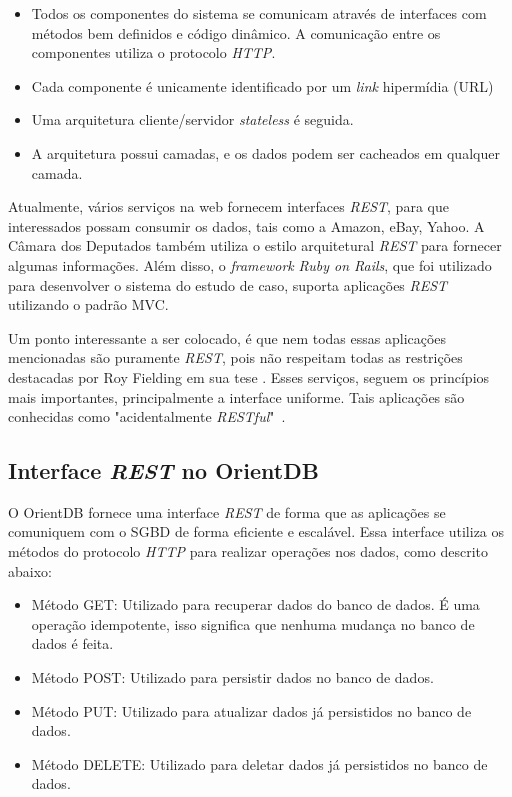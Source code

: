 \begin{itemize}
	\item Todos os componentes do sistema se comunicam através de interfaces com métodos bem definidos e código dinâmico. A comunicação entre os componentes utiliza o protocolo \textit{HTTP}.
	\item Cada componente é unicamente identificado por um \textit{link} hipermídia (URL)
	\item Uma arquitetura cliente/servidor \textit{stateless} é seguida.
	\item A arquitetura possui camadas, e os dados podem ser cacheados em qualquer camada.
\end{itemize}

	Atualmente, vários serviços na web fornecem interfaces \textit{REST}, para que interessados possam consumir os dados, tais como a Amazon, eBay, Yahoo. A Câmara dos Deputados também utiliza o estilo arquitetural \textit{REST} para fornecer algumas informações. Além disso, o \textit{framework} \textit{Ruby on Rails}, que foi utilizado para desenvolver o sistema do estudo de caso, suporta aplicações \textit{REST} utilizando o padrão MVC.
	
	Um ponto interessante a ser colocado, é que nem todas essas aplicações mencionadas são puramente \textit{REST}, pois não respeitam todas as restrições destacadas por Roy Fielding em sua tese \cite{fielding2000architectural}. Esses serviços, seguem os princípios mais importantes, principalmente a interface uniforme. Tais aplicações são conhecidas como "acidentalmente \textit{RESTful}"\ \cite{acident-rest}.

\subsection{Interface \textit{REST} no OrientDB} \label{rest_orient_db}
	O OrientDB fornece uma interface \textit{REST} de forma que as aplicações se comuniquem com o SGBD de forma eficiente e escalável. Essa interface utiliza os métodos do protocolo \textit{HTTP} para realizar operações nos dados, como descrito abaixo:
	
\begin{itemize}
	\item Método GET: Utilizado para recuperar dados do banco de dados. É uma operação idempotente, isso significa que nenhuma mudança no banco de dados é feita.
	\item Método POST: Utilizado para persistir dados no banco de dados.
	\item Método PUT: Utilizado para atualizar dados já persistidos no banco de dados.
	\item Método DELETE: Utilizado para deletar dados já persistidos no banco de dados.
\end{itemize}

